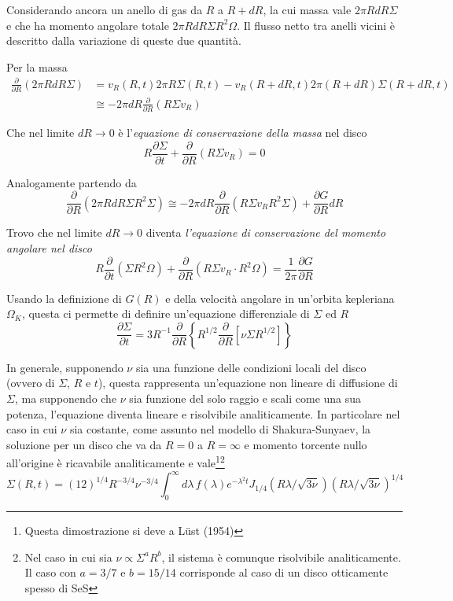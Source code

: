 \documentclass[a4paperbi]{article}
\begin{document}
	Considerando ancora un anello di gas da $R$ a $R+dR$, la cui massa vale $2\pi RdR\Sigma$ e che ha momento angolare totale $2\pi RdR\Sigma R^2\Omega$. Il flusso netto tra anelli vicini è descritto dalla variazione di queste due quantità. 
	
	Per la massa
	\begin{align*}
		\frac{\partial}{\partial R}(2\pi RdR\Sigma)&=v_R(R,t)2\pi R\Sigma(R,t)-v_R(R+dR,t)2\pi(R+dR)\Sigma(R+dR,t)\\
		&\cong-2\pi dR\frac{\partial}{\partial R}(R\Sigma v_R)
	\end{align*}
	
	Che nel limite $dR\rightarrow 0$ è l'\textit{equazione di conservazione della massa} nel disco
	\begin{equation}
		R\frac{\partial\Sigma}{\partial t}+\frac{\partial}{\partial R}(R\Sigma v_R)=0
	\end{equation}
	
	Analogamente partendo da
	\begin{equation*}
		\frac{\partial}{\partial R}(2\pi RdR\Sigma R^2\Sigma)\cong-2\pi dR\frac{\partial}{\partial R}(R\Sigma v_R R^2\Sigma)+\frac{\partial G}{\partial R}dR	
	\end{equation*}
	
	Trovo che nel limite $dR\rightarrow 0$ diventa \textit{l'equazione di conservazione del momento angolare nel disco}
	\begin{equation}
		R\frac{\partial}{\partial t}(\Sigma R^2\Omega)+\frac{\partial}{\partial R}(R\Sigma v_R\cdot R^2\Omega)=\frac{1}{2\pi}\frac{\partial G}{\partial R}
	\end{equation}
	
	Usando la definizione di $G(R)$ e della velocità angolare in un'orbita kepleriana $\Omega_K$,  questa ci permette di definire un'equazione differenziale di $\Sigma$ ed $R$
	\begin{equation}
		\frac{\partial\Sigma}{\partial t}=3R^{-1}\frac{\partial}{\partial R}\left\{R^{1/2}\frac{\partial}{\partial R}\left[\nu\Sigma R^{1/2}\right]\right\}
	\end{equation}
	
	In generale, supponendo $\nu$ sia una funzione delle condizioni locali del disco (ovvero di $\Sigma$, $R$ e $t$), questa rappresenta un'equazione non lineare di diffusione di $\Sigma$, ma supponendo che $\nu$ sia funzione del solo raggio e scali come una sua potenza, l'equazione diventa lineare e risolvibile analiticamente. In particolare nel caso in cui $\nu$ sia costante, come assunto nel modello di Shakura-Sunyaev, la soluzione per un disco che va da $R=0$ a $R=\infty$ e momento torcente nullo all'origine è ricavabile analiticamente e vale\footnote{Questa dimostrazione si deve a Lüst (1954)}\footnote{Nel caso in cui sia $\nu\propto\Sigma^aR^b$, il sistema è comunque risolvibile analiticamente. Il caso con $a=3/7$ e $b=15/14$ corrisponde al caso di un disco otticamente spesso di SeS}
	\begin{equation*}
		\Sigma(R,t)=(12)^{1/4}R^{-3/4}\nu^{-3/4}\int^{\infty}_0d\lambda\,f(\lambda)e^{-\lambda^2t}J_{1/4}(R\lambda/\sqrt{3\nu})(R\lambda/\sqrt{3\nu})^{1/4}
	\end{equation*}
	
\end{document}
